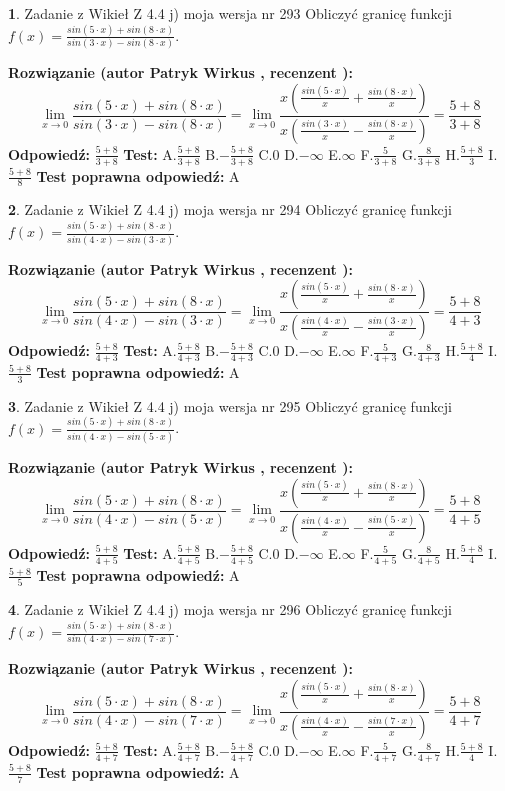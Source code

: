 \documentclass[12pt, a4paper]{article}
\theoremstyle{definition} %
\newtheorem{zad}{}
\newcommand{\zadStart}[1]{\begin{zad}#1\newline}
\newcommand{\zadStop}{\end{zad}}
\newcommand{\rozwStart}[2]{\noindent \textbf{Rozwiązanie (autor #1 , recenzent #2): }\newline}
\newcommand{\rozwStop}{\newline}
\newcommand{\odpStart}{\noindent \textbf{Odpowiedź:}\newline}
\newcommand{\odpStop}{\newline}
\newcommand{\testStart}{\noindent \textbf{Test:}\newline}
\newcommand{\testStop}{\newline}
\newcommand{\kluczStart}{\noindent \textbf{Test poprawna odpowiedź:}\newline}
\newcommand{\kluczStop}{\newline}
\begin{document}
\zadStart{Zadanie z Wikieł Z 4.4 j) moja wersja nr 293}
Obliczyć granicę funkcji $f(x)=\frac{sin(5\cdot x) +sin(8\cdot x)}{sin(3\cdot x) -sin(8\cdot x)}$.
\zadStop
\rozwStart{Patryk Wirkus}{}
$$\lim\limits_{x\to 0}\frac{sin(5\cdot x) +sin(8\cdot x)}{sin(3\cdot x) -sin(8\cdot x)}=\lim\limits_{x\to 0}\frac{x(\frac{sin(5\cdot x)}{x}+\frac{sin(8\cdot x)}{x})}{x(\frac{sin(3\cdot x)}{x}-\frac{sin(8\cdot x)}{x})}=\frac{5+8}{3+8}$$
\rozwStop
\odpStart
$\frac{5+8}{3+8}$
\odpStop
\testStart
A.$\frac{5+8}{3+8}$
B.$-\frac{5+8}{3+8}$
C.$0$
D.$-\infty$
E.$\infty$
F.$\frac{5}{3+8}$
G.$\frac{8}{3+8}$
H.$\frac{5+8}{3}$
I.$\frac{5+8}{8}$
\testStop
\kluczStart
A
\kluczStop



\zadStart{Zadanie z Wikieł Z 4.4 j) moja wersja nr 294}
Obliczyć granicę funkcji $f(x)=\frac{sin(5\cdot x) +sin(8\cdot x)}{sin(4\cdot x) -sin(3\cdot x)}$.
\zadStop
\rozwStart{Patryk Wirkus}{}
$$\lim\limits_{x\to 0}\frac{sin(5\cdot x) +sin(8\cdot x)}{sin(4\cdot x) -sin(3\cdot x)}=\lim\limits_{x\to 0}\frac{x(\frac{sin(5\cdot x)}{x}+\frac{sin(8\cdot x)}{x})}{x(\frac{sin(4\cdot x)}{x}-\frac{sin(3\cdot x)}{x})}=\frac{5+8}{4+3}$$
\rozwStop
\odpStart
$\frac{5+8}{4+3}$
\odpStop
\testStart
A.$\frac{5+8}{4+3}$
B.$-\frac{5+8}{4+3}$
C.$0$
D.$-\infty$
E.$\infty$
F.$\frac{5}{4+3}$
G.$\frac{8}{4+3}$
H.$\frac{5+8}{4}$
I.$\frac{5+8}{3}$
\testStop
\kluczStart
A
\kluczStop



\zadStart{Zadanie z Wikieł Z 4.4 j) moja wersja nr 295}
Obliczyć granicę funkcji $f(x)=\frac{sin(5\cdot x) +sin(8\cdot x)}{sin(4\cdot x) -sin(5\cdot x)}$.
\zadStop
\rozwStart{Patryk Wirkus}{}
$$\lim\limits_{x\to 0}\frac{sin(5\cdot x) +sin(8\cdot x)}{sin(4\cdot x) -sin(5\cdot x)}=\lim\limits_{x\to 0}\frac{x(\frac{sin(5\cdot x)}{x}+\frac{sin(8\cdot x)}{x})}{x(\frac{sin(4\cdot x)}{x}-\frac{sin(5\cdot x)}{x})}=\frac{5+8}{4+5}$$
\rozwStop
\odpStart
$\frac{5+8}{4+5}$
\odpStop
\testStart
A.$\frac{5+8}{4+5}$
B.$-\frac{5+8}{4+5}$
C.$0$
D.$-\infty$
E.$\infty$
F.$\frac{5}{4+5}$
G.$\frac{8}{4+5}$
H.$\frac{5+8}{4}$
I.$\frac{5+8}{5}$
\testStop
\kluczStart
A
\kluczStop



\zadStart{Zadanie z Wikieł Z 4.4 j) moja wersja nr 296}
Obliczyć granicę funkcji $f(x)=\frac{sin(5\cdot x) +sin(8\cdot x)}{sin(4\cdot x) -sin(7\cdot x)}$.
\zadStop
\rozwStart{Patryk Wirkus}{}
$$\lim\limits_{x\to 0}\frac{sin(5\cdot x) +sin(8\cdot x)}{sin(4\cdot x) -sin(7\cdot x)}=\lim\limits_{x\to 0}\frac{x(\frac{sin(5\cdot x)}{x}+\frac{sin(8\cdot x)}{x})}{x(\frac{sin(4\cdot x)}{x}-\frac{sin(7\cdot x)}{x})}=\frac{5+8}{4+7}$$
\rozwStop
\odpStart
$\frac{5+8}{4+7}$
\odpStop
\testStart
A.$\frac{5+8}{4+7}$
B.$-\frac{5+8}{4+7}$
C.$0$
D.$-\infty$
E.$\infty$
F.$\frac{5}{4+7}$
G.$\frac{8}{4+7}$
H.$\frac{5+8}{4}$
I.$\frac{5+8}{7}$
\testStop
\kluczStart
A
\kluczStop
\end{document}
